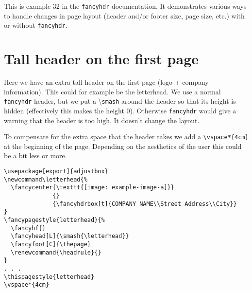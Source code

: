 \documentclass[twoside]{article}
\newcommand\letterhead{%
  \fancycenter{\texttt{[image: example-image-a]}}
              {}
              {\fancyhdrbox[t]{COMPANY NAME\\Street Address\\City}}%
}
\renewcommand{\headrule}{}
\newcommand\cs[1]{\textbackslash\texttt{#1}}
\begin{document}
\thispagestyle{letterhead}
\vspace*{4cm}

\noindent
\begin{boxedminipage}{\textwidth}
This is example 32 in the \texttt{fancyhdr} documentation. It demonstrates various ways to handle changes in page layout (header and/or footer size, page size, etc.) with or without \texttt{fancyhdr}.
\end{boxedminipage}

\tableofcontents


\section{Tall header on the first page}
\label{sec:firstpage}

\noindent
\begin{boxedminipage}{\textwidth}
Here we have an extra tall header on the first page (logo + company information). This could for example be the letterhead. We use a normal \texttt{fancyhdr} header, but we put a \cs{smash} around the header so that its height is hidden (effectively this makes the height 0). Otherwise \texttt{fancyhdr} would give a warning that the header is too high. It doesn't change the layout.

To compensate for the extra space that the header takes we add a \verb|\vspace*{4cm}| at the beginning of the page. Depending on the aesthetics of the user this could be a bit less or more.
\end{boxedminipage}

\noindent
\begin{boxedminipage}{\textwidth}
\begin{verbatim}
\usepackage[export]{adjustbox}
\newcommand\letterhead{%
  \fancycenter{\texttt{[image: example-image-a]}}
              {}
              {\fancyhdrbox[t]{COMPANY NAME\\Street Address\\City}}
}
\fancypagestyle{letterhead}{%
  \fancyhf{}
  \fancyhead[L]{\smash{\letterhead}}
  \fancyfoot[C]{\thepage}
  \renewcommand{\headrule}{}  
}
. . .
\thispagestyle{letterhead}
\vspace*{4cm}
\end{verbatim}
\end{boxedminipage}
\medskip

\lipsum[1-6]
\end{document}
